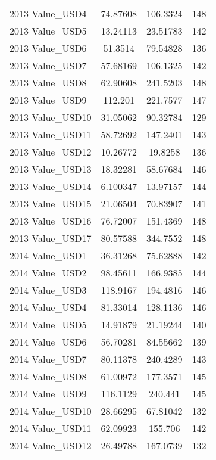 {\begin{tabular}{l*{1}{ccc}}
2013 Value\_USD4     &    74.87608&    106.3324&         148\\
2013 Value\_USD5     &    13.24113&    23.51783&         142\\
2013 Value\_USD6     &     51.3514&    79.54828&         136\\
2013 Value\_USD7     &    57.68169&    106.1325&         142\\
2013 Value\_USD8     &    62.90608&    241.5203&         148\\
2013 Value\_USD9     &     112.201&    221.7577&         147\\
2013 Value\_USD10    &    31.05062&    90.32784&         129\\
2013 Value\_USD11    &    58.72692&    147.2401&         143\\
2013 Value\_USD12    &    10.26772&     19.8258&         136\\
2013 Value\_USD13    &    18.32281&    58.67684&         146\\
2013 Value\_USD14    &    6.100347&    13.97157&         144\\
2013 Value\_USD15    &    21.06504&    70.83907&         141\\
2013 Value\_USD16    &    76.72007&    151.4369&         148\\
2013 Value\_USD17    &    80.57588&    344.7552&         148\\
2014 Value\_USD1     &    36.31268&    75.62888&         142\\
2014 Value\_USD2     &    98.45611&    166.9385&         144\\
2014 Value\_USD3     &    118.9167&    194.4816&         146\\
2014 Value\_USD4     &    81.33014&    128.1136&         146\\
2014 Value\_USD5     &    14.91879&    21.19244&         140\\
2014 Value\_USD6     &    56.70281&    84.55662&         139\\
2014 Value\_USD7     &    80.11378&    240.4289&         143\\
2014 Value\_USD8     &    61.00972&    177.3571&         145\\
2014 Value\_USD9     &    116.1129&     240.441&         145\\
2014 Value\_USD10    &    28.66295&    67.81042&         132\\
2014 Value\_USD11    &    62.09923&     155.706&         142\\
2014 Value\_USD12    &    26.49788&    167.0739&         132\\

\end{tabular}}
